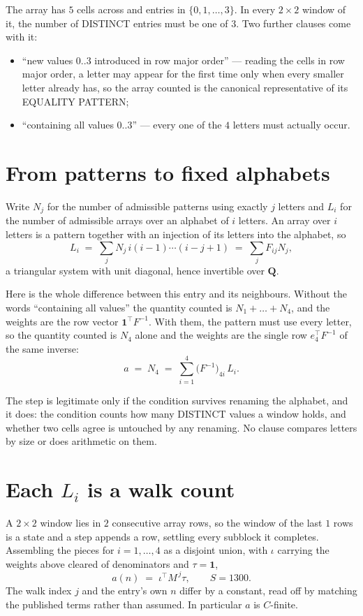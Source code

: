 \documentclass[11pt,a4paper]{article}
\theoremstyle{plain}
\theoremstyle{definition}
\begin{document}
The array has $5$ cells across and entries in $\{0,1,\dots,3\}$. In every
$2\times2$ window of it, the number of DISTINCT entries must be one of $3$. Two
further clauses come with it:

\begin{itemize}
\item ``new values $0..3$ introduced in row major order'' --- reading the cells in row major
order, a letter may appear for the first time only when every smaller letter already has, so
the array counted is the canonical representative of its EQUALITY PATTERN;
\item ``containing all values $0..3$'' --- every one of the $4$ letters must actually
occur.
\end{itemize}


\section{From patterns to fixed alphabets}

Write $N_j$ for the number of admissible patterns using exactly $j$ letters and $L_i$ for the
number of admissible arrays over an alphabet of $i$ letters. An array over $i$ letters is a
pattern together with an injection of its letters into the alphabet, so
\[
L_i\;=\;\sum_{j} N_j\,i(i-1)\cdots(i-j+1)\;=\;\sum_j F_{ij}N_j ,
\]
a triangular system with unit diagonal, hence invertible over $\mathbf{Q}$.

Here is the whole difference between this entry and its neighbours. Without the words
``containing all values'' the quantity counted is $N_1+\dots+N_{4}$, and the weights are
the row vector $\mathbf{1}^{\!\top}F^{-1}$. With them, the pattern must use every letter,
so the quantity counted is $N_{4}$ alone and the weights are the single row
$e_{4}^{\!\top}F^{-1}$ of the same inverse:
\[
a\;=\;N_{4}\;=\;\sum_{i=1}^{4}\bigl(F^{-1}\bigr)_{4i}\,L_i .
\]

The step is legitimate only if the condition survives renaming the alphabet, and it does: the
condition counts how many DISTINCT values a window holds, and whether two cells agree is
untouched by any renaming. No clause compares letters by size or does arithmetic on them.

\section{Each $L_i$ is a walk count}

A $2\times2$ window lies in $2$ consecutive array rows, so the window of the last
$1$ rows is a state and a step appends a row, settling every subblock it completes.
Assembling the pieces for $i=1,\dots,4$ as a disjoint union, with $\iota$ carrying the
weights above cleared of denominators and $\tau=\mathbf{1}$,
\[
a(n)\;=\;\iota^{\!\top}M^{\,j}\tau ,\qquad S=1300.
\]
The walk index $j$ and the entry's own $n$ differ by a constant, read off by matching the
published terms rather than assumed. In particular $a$ is $C$-finite.
\end{document}
